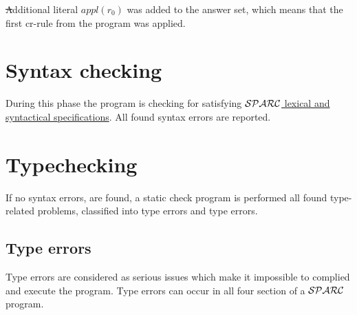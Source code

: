 \documentclass[12pt, letterpaper]{article}
\begin{document}
\st Additional literal $appl(r_0)$ was added to the answer set, which means that the 
first cr-rule from the program was applied.
\section{Syntax checking}
During this phase the program is checking for satisfying  \href{https://github.com/iensen/sparc_paper/blob/master/SparcTranslator/parser/Sparc_grammar.txt}{${\cal SPARC}$ lexical and syntactical specifications}.
All found syntax errors are reported.
\section{Typechecking}
If no syntax errors, are found,  a static check program is performed all found type-related problems, classified into type errors and type errors.
\subsection{Type errors}
Type errors are considered as serious issues which make it  impossible to complied and execute the program.
Type errors can occur in all four section of a ${\cal SPARC}$ program.
\end{document}

